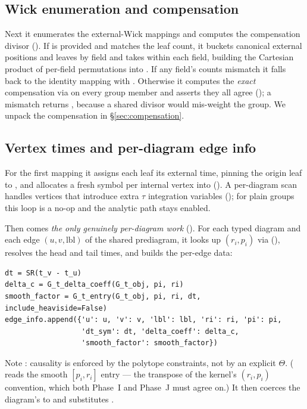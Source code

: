 \subsection{Wick enumeration and compensation}

Next it enumerates the external-Wick mappings and computes the compensation
divisor (). If  is
provided and matches the leaf count, it buckets canonical external positions and
leaves by field and takes  within each field,
building the Cartesian product of per-field permutations into .
If any field's counts mismatch it falls back to the identity mapping with
. Otherwise it computes the \emph{exact} compensation via
 on every group member and asserts they all
agree (); a mismatch returns
, because a shared divisor would mis-weight the group. We
unpack the compensation in \S\ref{sec:compensation}.

\subsection{Vertex times and per-diagram edge info}

For the first mapping it assigns each leaf its external time, pinning the origin
leaf to , and allocates a fresh symbol  per internal
vertex into  (). A
per-diagram scan handles  vertices that introduce extra
$\tau$ integration variables (); for plain
groups this loop is a no-op and the analytic path stays enabled.

Then comes \emph{the only genuinely per-diagram work}
(). For each typed diagram and each edge
$(u,v,\text{lbl})$ of the shared prediagram, it looks up $(r_i, p_i)$ via
 (), resolves the head
and tail times, and builds the per-edge data:
\begin{lstlisting}
dt = SR(t_v - t_u)
delta_c = G_t_delta_coeff(G_t_obj, pi, ri)
smooth_factor = G_t_entry(G_t_obj, pi, ri, dt, include_heaviside=False)
edge_info.append({'u': u, 'v': v, 'lbl': lbl, 'ri': ri, 'pi': pi,
                  'dt_sym': dt, 'delta_coeff': delta_c,
                  'smooth_factor': smooth_factor})
\end{lstlisting}
Note : causality is enforced by the polytope
constraints, not by an explicit $\Theta$. ( reads the smooth
$[p_i, r_i]$ entry --- the transpose of the kernel's $(r_i, p_i)$ convention, which
both Phase~I and Phase~J must agree on.) It then coerces the diagram's
 to  and substitutes .

